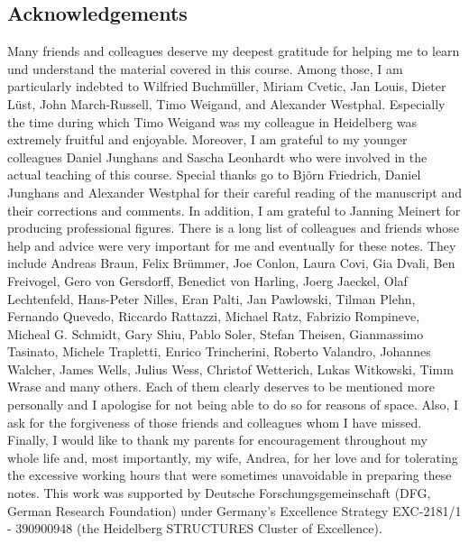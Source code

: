 \documentclass[12pt]{article}
\numberwithin{equation}{section}
\begin{document}
\subsection*{Acknowledgements}
Many friends and colleagues deserve my deepest gratitude for helping me to learn und understand the material covered in this course. Among those, I am particularly indebted to Wilfried Buchm\"uller, Miriam Cvetic, Jan Louis,  Dieter L\"ust, John March-Russell, Timo Weigand, and Alexander Westphal. Especially the time during which Timo Weigand was my colleague in Heidelberg was extremely fruitful and enjoyable. Moreover, I am grateful to my younger colleagues Daniel Junghans and Sascha Leonhardt who were involved in the actual teaching of this course. Special thanks go to Bj\"orn Friedrich, Daniel Junghans and Alexander Westphal for their careful reading of the manuscript and their corrections and comments. In addition, I am grateful to Janning Meinert for producing professional figures.
There is a long list of colleagues and friends whose help and advice were very important for me and eventually for these notes. They include Andreas Braun, Felix Br\"ummer, Joe Conlon, Laura Covi, Gia Dvali, Ben Freivogel, Gero von Gersdorff, Benedict von Harling, Joerg Jaeckel, Olaf Lechtenfeld, Hans-Peter Nilles, Eran Palti, Jan Pawlowski, Tilman Plehn, Fernando Quevedo, Riccardo Rattazzi, Michael Ratz, Fabrizio Rompineve, Micheal G. Schmidt, Gary Shiu, Pablo Soler, Stefan Theisen, Gianmassimo Tasinato, Michele Trapletti, Enrico Trincherini, Roberto Valandro, Johannes Walcher, James Wells, Julius Wess, Christof Wetterich, Lukas Witkowski, Timm Wrase and many others. Each of them clearly deserves to be mentioned more personally and I apologise for not being able to do so for reasons of space. Also, I ask for the forgiveness of those friends and colleagues whom I have missed. Finally, I would like to thank my parents for encouragement throughout my whole life and, most importantly, my wife, Andrea, for her love and for tolerating the excessive working hours that were sometimes unavoidable in preparing these notes. This work was supported by Deutsche Forschungsgemeinschaft (DFG, German Research Foundation) under Germany's Excellence Strategy EXC-2181/1 - 390900948 (the Heidelberg STRUCTURES Cluster of Excellence). 
\end{document}
